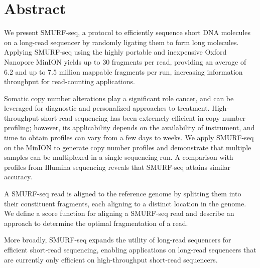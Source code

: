 \chapter*{Abstract}
We present SMURF-seq, a protocol to efficiently sequence short DNA
molecules on a long-read sequencer by randomly ligating them to form
long molecules.
%
Applying SMURF-seq using the highly portable and inexpensive Oxford
Nanopore MinION yields up to 30 fragments per read, providing an average
of 6.2 and up to 7.5 million mappable fragments per run, increasing
information throughput for read-counting applications.

Somatic copy number alterations play a significant role cancer, and can
be leveraged for diagnostic and personalized approaches to treatment.
High-throughput short-read sequencing has been extremely efficient in
copy number profiling; however, its applicability depends on the
availability of instrument, and time to obtain profiles can vary from a
few days to weeks.
We apply SMURF-seq on the MinION to generate copy number profiles and
demonstrate that multiple samples can be multiplexed in a single
sequencing run.  A comparison with profiles from Illumina sequencing
reveals that SMURF-seq attains similar accuracy.

A SMURF-seq read is aligned to the reference genome by splitting them
into their  constituent fragments, each aligning to a distinct location
in the genome.
We define a score function for aligning a SMURF-seq read and describe an
approach to determine the optimal fragmentation of a read.

More broadly, SMURF-seq expands the utility of long-read sequencers for
efficient short-read sequencing, enabling applications on long-read
sequencers that are currently only efficient on high-throughput
short-read sequencers.
